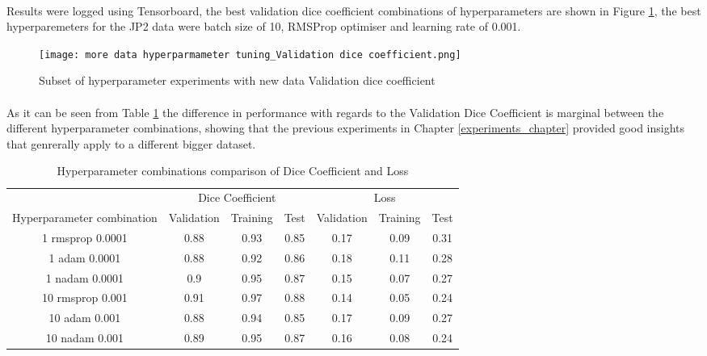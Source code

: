 \paragraph{}
Results were logged using Tensorboard, the best validation dice coefficient combinations of hyperparameters are shown in Figure \ref{hp}, the best hyperparemeters for the JP2 data were batch size of 10, \gls{RMSProp} optimiser and learning rate of 0.001.

\begin{figure}[hbt!]
    \centering
    \texttt{[image: more data hyperparmameter tuning\_Validation dice coefficient.png]}
    \caption{Subset of hyperparameter experiments with new data Validation dice coefficient}
    \label{hp}
\end{figure}
\paragraph{}
As it can be seen from Table \ref{tab_hp} the difference in performance with regards to the Validation Dice Coefficient is marginal between the different hyperparameter combinations, showing that the previous experiments in Chapter \ref{experiments_chapter} provided good insights that genrerally apply to a different bigger dataset.

\begin{table}[ht!] 
    \begin{center}
    \begin{tabular}{ccccccc} 
    \toprule
       & \multicolumn{3}{c}{Dice Coefficient}     & \multicolumn{3}{c}{Loss} \\
    Hyperparameter combination & Validation & Training & Test & Validation    & Training    & Test   \\ \midrule
    1 rmsprop 0.0001 & 0.88 & 0.93 & 0.85 & 0.17 & 0.09 & 0.31  \\ 1 adam 0.0001 & 0.88 & 0.92 & 0.86 & 0.18 & 0.11 & 0.28  \\ 1 nadam 0.0001 & 0.9 & 0.95 & 0.87 & 0.15 & 0.07 & 0.27  \\ \rowcolor{lightgray} 10 rmsprop 0.001 & 0.91 & 0.97 & 0.88 & 0.14 & 0.05 & 0.24  \\ 10 adam 0.001 & 0.88 & 0.94 & 0.85 & 0.17 & 0.09 & 0.27  \\ 10 nadam 0.001 & 0.89 & 0.95 & 0.87 & 0.16 & 0.08 & 0.24  \\
    \bottomrule
    \end{tabular}
  \end{center} 
  \caption{Hyperparameter combinations comparison of Dice Coefficient and Loss}\label{tab_hp}
\end{table}